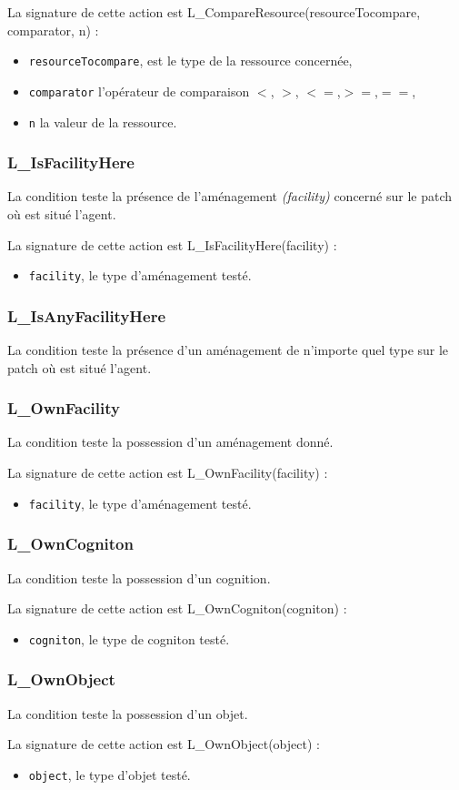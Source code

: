 La signature de cette action est L\_CompareResource(resourceTocompare, comparator, n) :
\begin{itemize}
	\item \texttt{resourceTocompare}, est le type de la ressource concernée,
	\item \texttt{comparator} l'opérateur de comparaison $<$, $>$, $<=$,$ >=$,$ ==$,
	\item \texttt{n} la valeur de la ressource.
	\end{itemize}
	
	
\subsubsection{L\_IsFacilityHere}

La condition teste la présence de l'aménagement \textit{(facility)} concerné sur le patch  où est situé  l'agent.

La signature de cette action est L\_IsFacilityHere(facility) :
\begin{itemize}
	\item \texttt{facility},  le type d'aménagement testé.
	\end{itemize}	
	
\subsubsection{L\_IsAnyFacilityHere}
La condition teste la présence d'un aménagement de n'importe quel type sur le patch  où est situé  l'agent.

\subsubsection{L\_OwnFacility}

La condition teste la possession d'un aménagement donné.

La signature de cette action est L\_OwnFacility(facility) :
\begin{itemize}
	\item \texttt{facility},  le type d'aménagement testé.
	\end{itemize}	
\subsubsection{L\_OwnCogniton}
La condition teste la possession d'un cognition.

La signature de cette action est L\_OwnCogniton(cogniton) :
\begin{itemize}
	\item \texttt{cogniton},  le type de cogniton testé.
	\end{itemize}	
\subsubsection{L\_OwnObject}

La condition teste la possession d'un objet. 

La signature de cette action est L\_OwnObject(object) :
\begin{itemize}
	\item \texttt{object},  le type d'objet testé.
	\end{itemize}	

